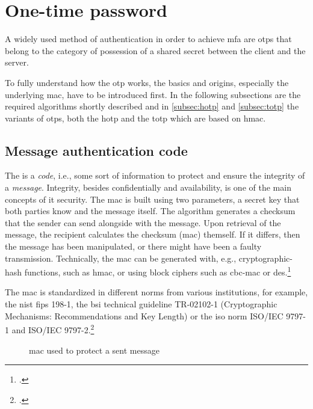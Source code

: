 \section{One-time password}

A widely used method of authentication in order to achieve \gls{mfa} are \glspl{otp} that belong to the category of possession of a shared secret between the client and the server.

To fully understand how the \gls{otp} works, the basics and origins, especially the underlying \gls{mac}, have to be introduced first. In the following subsections are the required algorithms shortly described and in \autoref{subsec:hotp} and \autoref{subsec:totp} the variants of \glspl{otp}, both the \gls{hotp} and the \gls{totp} which are based on \gls{hmac}.

\subsection{Message authentication code}

The  is a \textit{code}, i.e., some sort of information to protect and ensure the integrity of a \textit{message}. Integrity, besides confidentially and availability, is one of the main concepts of \gls{it} security. The \gls{mac} is built using two parameters, a secret key that both parties know and the message itself. The algorithm generates a checksum that the sender can send alongside with the message. Upon retrieval of the message, the recipient calculates the checksum (\gls{mac}) themself. If it differs, then the message has been manipulated, or there might have been a faulty transmission. Technically, the \gls{mac} can be generated with, e.g., cryptographic-hash functions, such as \gls{hmac}, or using block ciphers such as \gls{cbc-mac} or \gls{des}.\footcites[See][565]{320284}[See][163--168]{anderson2008security}[See][391--393]{eckert-it-sec-9}

The \gls{mac} is standardized in different norms from various institutions, for example, the \gls{nist} \gls{fips} 198-1, the \gls{bsi} technical guideline TR-02102-1 (\frqq Cryptographic Mechanisms: Recommendations and Key Length\flqq{}) or the \gls{iso} norm ISO/IEC 9797-1 and ISO/IEC 9797-2.\footcites[See][]{FIPS198}[See][]{bsi2019recommendations}[See][]{iso9797-1}[See][]{iso9797-2}
 
\begin{figure}[hbt]
	\centering
	
	\caption[\Glsdesc{mac} used to protect a sent message]{\Glsdesc{mac} used to protect a sent message\footnotemark}
	\label{fig:mac}
\end{figure}

